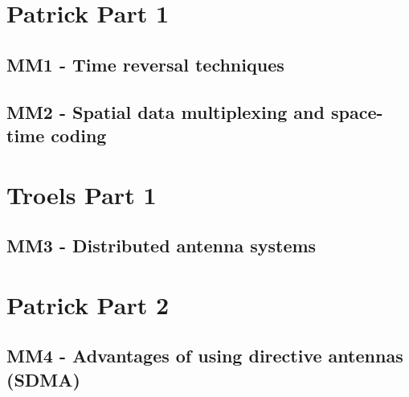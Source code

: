 



    \singlespacing
    \pagestyle{empty}	
	
	\cleardoublepage
	
	\pagestyle{plain}
		
	\tableofcontents 
	\onehalfspacing
	\pagestyle{fancy} %
    \setcounter{page}{0} %

\part{Patrick Part 1}

\chapter{MM1 - Time reversal techniques}







\chapter{MM2 - Spatial data multiplexing and space-time coding}






\part{Troels Part 1}
\chapter{MM3 - Distributed antenna systems}






\part{Patrick Part 2}
\chapter{MM4 - Advantages of using directive antennas (SDMA)}





